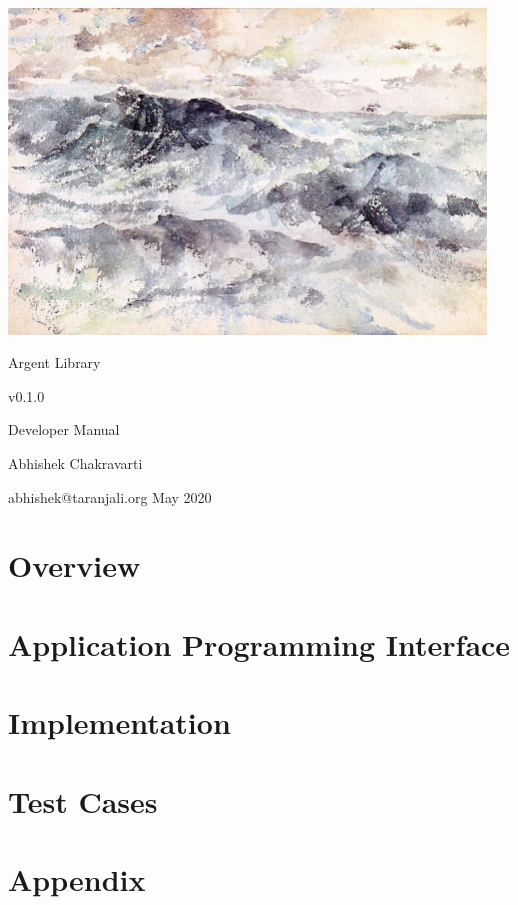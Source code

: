 \documentclass[a4paper, 10pt, twocolumn]{report}
\begin{document}
\begin{titlepage}
  \centering
  \includegraphics[width=0.95\textwidth]{the-great-sea.jpg}\par \vspace{1em}
  \Huge Argent Library \par \vspace{0.5em} \large v0.1.0 \par \vspace{0.5em} 
      \LARGE Developer Manual \par \vspace{5em} Abhishek Chakravarti \par
      \vspace{0.5em} \small abhishek@taranjali.org \vfill \large May 2020
\end{titlepage}

\tableofcontents
\listoffigures
\listoftables

\part{Overview}
\part{Application Programming Interface}
\part{Implementation}
\part{Test Cases}
\part{Appendix}
\end{document}
